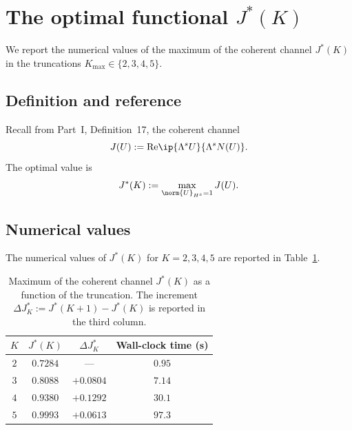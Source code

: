 \section{The optimal functional $J^\ast(K)$}
\label{part-5:sec:J-numeric}

We report the numerical values of the maximum of the coherent 
channel $J^\ast(K)$ in the truncations $K_{\max}\in\{2,3,4,5\}$.

\subsection{Definition and reference}
\label{part-5:ssec:J-def-V}

Recall from Part~I, Definition~17, the coherent channel
\begin{equation}\label{part-5:eq:J-def-V}
J(U) := \mathrm{Re}\ip{\Lambda^s U}{\Lambda^s N(U)}.
\end{equation}
The optimal value is
\begin{equation}\label{part-5:eq:J-star-def}
J^\ast(K) := \max_{\norm{U}_{H^s}=1} J(U).
\end{equation}

\subsection{Numerical values}
\label{part-5:ssec:J-values}

The numerical values of $J^\ast(K)$ for $K=2,3,4,5$ are reported in 
Table~\ref{part-5:tab:J-values-V}.

\begin{table}[h]
\centering
\caption{Maximum of the coherent channel $J^\ast(K)$ as a function 
of the truncation. The increment $\Delta J^\ast_K := J^\ast(K+1)-J^\ast(K)$ 
is reported in the third column.}
\label{part-5:tab:J-values-V}
\begin{tabular}{cccc}
\toprule
$K$ & $J^\ast(K)$ & $\Delta J^\ast_K$ & Wall-clock time (s) \\
\midrule
$2$ & $0.7284$ & --- & $0.95$ \\
$3$ & $0.8088$ & $+0.0804$ & $7.14$ \\
$4$ & $0.9380$ & $+0.1292$ & $30.1$ \\
$5$ & $0.9993$ & $+0.0613$ & $97.3$ \\
\bottomrule
\end{tabular}
\end{table}

